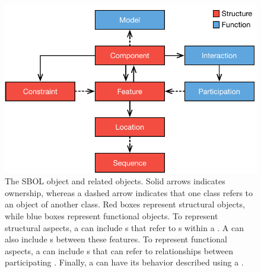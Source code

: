 \begin{figure}[ht]
\begin{center}
  \includegraphics[scale=0.7]{images/SBOL3-main-classes.pdf}
\caption{The SBOL  object and related objects.  Solid arrows indicates ownership, whereas a dashed arrow indicates that one class refers to an object of another class.  Red boxes represent structural objects, while blue boxes represent functional objects.  To represent structural aspects, a  can include s that refer to s within a .  A  can also include s between these features.  To represent functional aspects, a  can include s that can refer to relationships between participating .  Finally, a  can have its behavior described using a .}
\label{images:overview1}
\end{center}
\end{figure}

